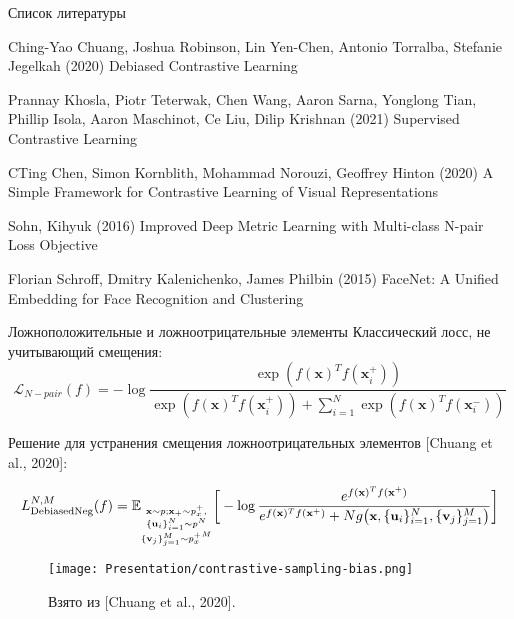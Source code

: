 \documentclass{beamer}
\begin{document}
\begin{frame}{Список литературы}
\begin{thebibliography}{99} 
    \footnotesize
    
        Ching-Yao Chuang, Joshua Robinson, Lin Yen-Chen, Antonio Torralba, Stefanie Jegelkah (2020)
        \newblock Debiased Contrastive Learning

        Prannay Khosla, Piotr Teterwak, Chen Wang, Aaron Sarna, Yonglong Tian, Phillip Isola, Aaron Maschinot, Ce Liu, Dilip Krishnan (2021)
        \newblock Supervised Contrastive Learning

        CTing Chen, Simon Kornblith, Mohammad Norouzi, Geoffrey Hinton (2020)
        \newblock A Simple Framework for Contrastive Learning of Visual Representations

        Sohn, Kihyuk (2016)
        \newblock Improved Deep Metric Learning with Multi-class N-pair Loss Objective

        Florian Schroff, Dmitry Kalenichenko, James Philbin (2015)
        \newblock FaceNet: A Unified Embedding for Face Recognition and Clustering

\end{thebibliography}
\end{frame}
\begin{frame}{Ложноположительные и ложноотрицательные элементы}
Классический лосс, не учитывающий смещения:
\[\mathcal{L}_{N-pair}(f) = - \log \frac{\exp(f(\textbf{x})^T f(\textbf{x}_i^+))}{\exp(f(\textbf{x})^T f(\textbf{x}_i^+)) + \sum _{i=1}^{N} \exp(f(\textbf{x})^Tf(\textbf{x}_i^-))}\]

Решение для устранения смещения ложноотрицательных элементов [Chuang et al., 2020]:

\begin{equation*} \small
L_{\text{DebiasedNeg}}^{N, M}(f) = \mathbb{E}_{\substack{\textbf{x} \sim p; \textbf{x}_+ \sim p_x^+,\\ \{\textbf{u}_i\}_{i=1}^N \sim p^N \\ \{\textbf{v}_j\}_{j=1}^M \sim {p_x^+}^M}}  \bigg[ -\log \frac{e^{f(\textbf{x})^T f(\textbf{x}^+)} }{e^{f(\textbf{x})^T f(\textbf{x}^+)} + N g\big(\textbf{x}, \{\textbf{u}_i\}_{i=1}^N, \{\textbf{v}_j\}_{j=1}^M\big)} \bigg]
\end{equation*}

\begin{figure}
\texttt{[image: Presentation/contrastive-sampling-bias.png]}
\caption{Взято из [Chuang et al., 2020].}
\end{figure}
\end{frame}
\end{document}
